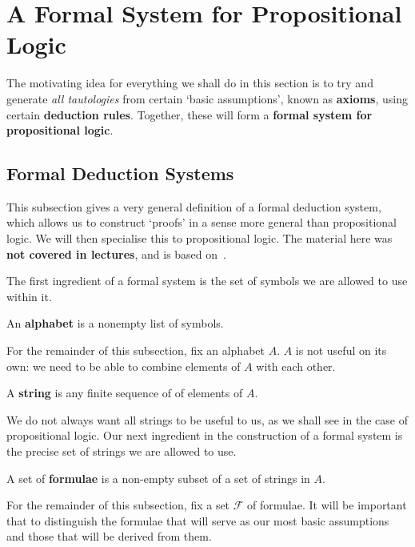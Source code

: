 \section{A Formal System for Propositional Logic}

The motivating idea for everything we shall do in this section is to try and generate \textit{all tautologies} from certain `basic assumptions', known as \textbf{axioms}, using certain \textbf{deduction rules}. Together, these will form a \textbf{formal system for propositional logic}.

\subsection{Formal Deduction Systems}

This subsection gives a very general definition of a formal deduction system, which allows us to construct `proofs' in a sense more general than propositional logic. We will then specialise this to propositional logic. The material here was \textbf{not covered in lectures}, and is based on~\cite[Definition 1.2.1]{2018LecNotes}.

The first ingredient of a formal system is the set of symbols we are allowed to use within it.

\begin{boxdefinition}[Alphabet]
    An \textbf{alphabet} is a nonempty list of symbols.
\end{boxdefinition}

For the remainder of this subsection, fix an alphabet $A$. $A$ is not useful on its own: we need to be able to combine elements of $A$ with each other.

\begin{boxdefinition}[Strings]
    A \textbf{string} is any finite sequence of of elements of $A$.
\end{boxdefinition}

We do not always want all strings to be useful to us, as we shall see in the case of propositional logic. Our next ingredient in the construction of a formal system is the precise set of strings we are allowed to use.

\begin{boxdefinition}[Formulae]
    A set of \textbf{formulae} is a non-empty subset of a set of strings in $A$.
\end{boxdefinition}

For the remainder of this subsection, fix a set $\mathcal{F}$ of formulae. It will be important that to distinguish the formulae that will serve as our most basic assumptions and those that will be derived from them.

